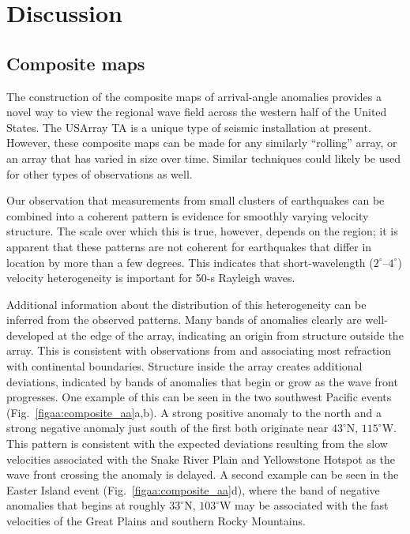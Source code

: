 \documentclass[12pt,oneside]{book}
\newcommand{\degree}[1]{\mbox{$#1^{\circ}$}}
\begin{document}
\section{Discussion}\label{sec:discussion}
\subsection{Composite maps}
The construction of the composite maps of arrival-angle anomalies provides a novel way to view the regional wave field across the western half of the United States. The USArray TA is a unique type of seismic installation at present. However, these composite maps can be made for any similarly ``rolling'' array, or an array that has varied in size over time. Similar techniques could likely be used for other types of observations as well. 

Our observation that measurements from small clusters of earthquakes can be combined into a coherent pattern is evidence for smoothly varying velocity structure. The scale over which this is true, however, depends on the region; it is apparent that these patterns are not coherent for earthquakes that differ in location by more than a few degrees. This indicates that short-wavelength (\degree{2}--\degree{4}) velocity heterogeneity is important for 50-s Rayleigh waves. 

Additional information about the distribution of this heterogeneity can be inferred from the observed patterns. Many bands of anomalies clearly are well-developed at the edge of the array, indicating an origin from structure outside the array. This is consistent with observations from \citet{BungumCapon1974} and \citet{LevshinBerteussen1979} associating most refraction with continental boundaries. Structure inside the array creates additional deviations, indicated by bands of anomalies that begin or grow as the wave front progresses. One example of this can be seen in the two southwest Pacific events (Fig.~\ref{figaa:composite_aa}a,b). A strong positive anomaly to the north and a strong negative anomaly just south of the first both originate near \degree{43}N, \degree{115}W. This pattern is consistent with the expected deviations resulting from the slow velocities associated with the Snake River Plain and Yellowstone Hotspot \citep[e.g.,][]{LinRitzwoller2011} as the wave front crossing the anomaly is delayed. A second example can be seen in the Easter Island event (Fig.~\ref{figaa:composite_aa}d), where the band of negative anomalies that begins at roughly \degree{33}N, \degree{103}W may be associated with the fast velocities of the Great Plains and southern Rocky Mountains. 
\end{document}
